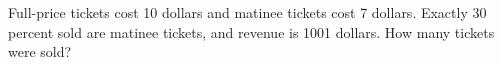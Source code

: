Full-price tickets cost 10 dollars and matinee tickets cost 7 dollars. Exactly 30 percent sold are matinee tickets, and revenue is 1001 dollars. How many tickets were sold?
